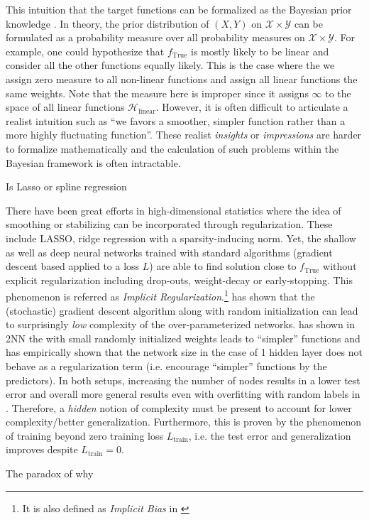 This intuition that the target functions can be formalized as the Bayesian prior
knowledge \TOCITE. In theory, the prior distribution of $(X, Y)$ on $\mathcal{X}
\times \mathcal{Y}$ can be formulated as a probability measure over all
probability measures on $\mathcal{X} \times \mathcal{Y}$.  For example, one
could hypothesize that $f_{\text{True}}$ is mostly likely to be linear and
consider all the other functions equally likely. This is the case where the we
assign zero measure to all non-linear functions and assign all linear functions
the same weights. Note that the measure here is improper since it assigns
$\infty$ to the space of all linear functions $\mathcal{H}_{\text{linear}}$.
However, it is often difficult to articulate a realist intuition such as ``we
favors a smoother, simpler function rather than a more highly fluctuating
function''. These realist \textit{insights} or \textit{impressions} are
harder to formalize mathematically and the calculation of such problems within
the Bayesian framework is often intractable.

Is Lasso or spline regression 


There have been great efforts in high-dimensional statistics where the idea
of smoothing or stabilizing can be incorporated through regularization. These
include LASSO, ridge regression with a sparsity-inducing norm. Yet, the shallow
as well as deep neural networks \cite{neyshaburSearchRealInductive2015,
maennelGradientDescentQuantizes2018, liLearningOverparameterizedNeural2019,
kuboImplicitRegularizationOverparameterized2019,
neyshaburImplicitRegularizationDeep2017} trained with standard algorithms
(gradient descent based applied to a loss $L$) are able to find solution close
to $f_{\text{True}}$ without explicit regularization including drop-outs,
weight-decay or early-stopping. This phenomenon is referred as \textit{Implicit
Regularization}.\footnote{ It is also defined as \textit{Implicit Bias} in
\cite{soudryImplicitBiasGradient2022} }
\cite{kuboImplicitRegularizationOverparameterized2019} has shown that the
(stochastic) gradient descent algorithm along with random initialization can
lead to surprisingly \textit{low} complexity of the over-parameterized networks.
\cite{maennelGradientDescentQuantizes2018} has shown in 2NN the with small
randomly initialized weights leads to ``simpler'' functions and
\cite{maennelGradientDescentQuantizes2018, neyshaburSearchRealInductive2015} has
empirically shown that the network size in the case of 1 hidden layer does not
behave as a regularization term (i.e. encourage ``simpler'' functions by the
predictors). In both setups, increasing the number of nodes results in a lower
test error and overall more general results even with overfitting with random
labels in \cite{neyshaburSearchRealInductive2015}. Therefore, a \textit{hidden}
notion of complexity must be present to account for lower complexity/better
generalization. Furthermore, this is proven by the phenomenon of training beyond
zero training loss \TOCITE $L_{\text{train}}$, i.e. the test error and
generalization improves despite $L_{\text{train}} = 0$.

The paradox of why 


